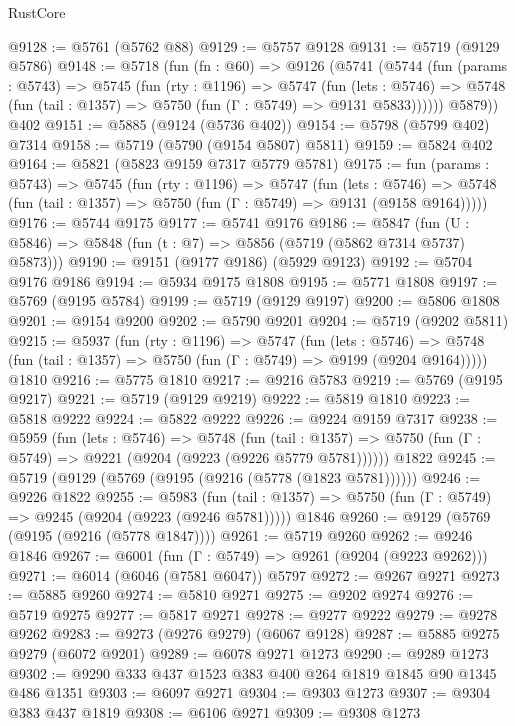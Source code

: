 \begin{lexlean}{RustCore}
\begin{coremodule}
{\begin{coremodule}
{{{{{{{{{{{{{{{{{{{{{{{{{{{{{{{{{{{{{{{{{{{{@9128 := @5761 (@5762 @88)
@9129 := @5757 @9128
@9131 := @5719 (@9129 @5786)
@9148 := @5718
    (fun (fn : @60) =>
    @9126
      (@5741
        (@5744
          (fun (params : @5743) =>
          @5745
            (fun (rty : @1196) =>
            @5747
              (fun (lets : @5746) =>
              @5748 (fun (tail : @1357) => @5750 (fun (Γ : @5749) => @9131 @5833))))))
        @5879))
    @402
@9151 := @5885 (@9124 (@5736 @402))
@9154 := @5798 (@5799 @402) @7314
@9158 := @5719 (@5790 (@9154 @5807) @5811)
@9159 := @5824 @402
@9164 := @5821 (@5823 @9159 @7317 @5779 @5781)
@9175 := fun (params : @5743) =>
  @5745
    (fun (rty : @1196) =>
    @5747
      (fun (lets : @5746) =>
      @5748 (fun (tail : @1357) => @5750 (fun (Γ : @5749) => @9131 (@9158 @9164)))))
@9176 := @5744 @9175
@9177 := @5741 @9176
@9186 := @5847 (fun (U : @5846) => @5848 (fun (t : @7) => @5856 (@5719 (@5862 @7314 @5737) @5873)))
@9190 := @9151 (@9177 @9186) (@5929 @9123)
@9192 := @5704 @9176 @9186
@9194 := @5934 @9175 @1808
@9195 := @5771 @1808
@9197 := @5769 (@9195 @5784)
@9199 := @5719 (@9129 @9197)
@9200 := @5806 @1808
@9201 := @9154 @9200
@9202 := @5790 @9201
@9204 := @5719 (@9202 @5811)
@9215 := @5937
    (fun (rty : @1196) =>
    @5747
      (fun (lets : @5746) =>
      @5748 (fun (tail : @1357) => @5750 (fun (Γ : @5749) => @9199 (@9204 @9164)))))
    @1810
@9216 := @5775 @1810
@9217 := @9216 @5783
@9219 := @5769 (@9195 @9217)
@9221 := @5719 (@9129 @9219)
@9222 := @5819 @1810
@9223 := @5818 @9222
@9224 := @5822 @9222
@9226 := @9224 @9159 @7317
@9238 := @5959
    (fun (lets : @5746) =>
    @5748
      (fun (tail : @1357) => @5750 (fun (Γ : @5749) => @9221 (@9204 (@9223 (@9226 @5779 @5781))))))
    @1822
@9245 := @5719 (@9129 (@5769 (@9195 (@9216 (@5778 (@1823 @5781))))))
@9246 := @9226 @1822
@9255 := @5983
    (fun (tail : @1357) => @5750 (fun (Γ : @5749) => @9245 (@9204 (@9223 (@9246 @5781)))))
    @1846
@9260 := @9129 (@5769 (@9195 (@9216 (@5778 @1847))))
@9261 := @5719 @9260
@9262 := @9246 @1846
@9267 := @6001 (fun (Γ : @5749) => @9261 (@9204 (@9223 @9262)))
@9271 := @6014 (@6046 (@7581 @6047)) @5797
@9272 := @9267 @9271
@9273 := @5885 @9260
@9274 := @5810 @9271
@9275 := @9202 @9274
@9276 := @5719 @9275
@9277 := @5817 @9271
@9278 := @9277 @9222
@9279 := @9278 @9262
@9283 := @9273 (@9276 @9279) (@6067 @9128)
@9287 := @5885 @9275 @9279 (@6072 @9201)
@9289 := @6078 @9271 @1273
@9290 := @9289 @1273
@9302 := @9290 @333 @437 @1523 @383 @400 @264 @1819 @1845 @90 @1345 @486 @1351
@9303 := @6097 @9271
@9304 := @9303 @1273
@9307 := @9304 @383 @437 @1819
@9308 := @6106 @9271
@9309 := @9308 @1273
}}}}}}}}}}}}}}}}}}}}}}}}}}}}}}}}}}}}}}}}}}}}
\end{coremodule}}
\end{coremodule}
\end{lexlean}
